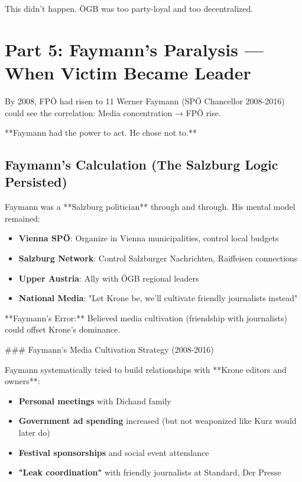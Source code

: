 This didn't happen. ÖGB was too party-loyal and too decentralized.


\section*{Part 5: Faymann's Paralysis --- When Victim Became Leader}

By 2008, FPÖ had risen to 11%
Werner Faymann (SPÖ Chancellor 2008-2016) could see the correlation: Media concentration → FPÖ rise.

**Faymann had the power to act. He chose not to.**

\subsection*{Faymann's Calculation (The Salzburg Logic Persisted)}

Faymann was a **Salzburg politician** through and through. His mental model remained:

\begin{itemize}
\item \textbf{Vienna SPÖ}: Organize in Vienna municipalities, control local budgets
\item \textbf{Salzburg Network}: Control Salzburger Nachrichten, Raiffeisen connections
\item \textbf{Upper Austria}: Ally with ÖGB regional leaders
\item \textbf{National Media}: "Let Krone be, we'll cultivate friendly journalists instead"
\end{itemize}

**Faymann's Error:** Believed media cultivation (friendship with journalists) could offset Krone's dominance.

### Faymann's Media Cultivation Strategy (2008-2016)

Faymann systematically tried to build relationships with **Krone editors and owners**:

\begin{itemize}
\item \textbf{Personal meetings} with Dichand family
\item \textbf{Government ad spending} increased (but not weaponized like Kurz would later do)
\item \textbf{Festival sponsorships} and social event attendance
\item \textbf{"Leak coordination"} with friendly journalists at Standard, Der Presse
\end{itemize}

